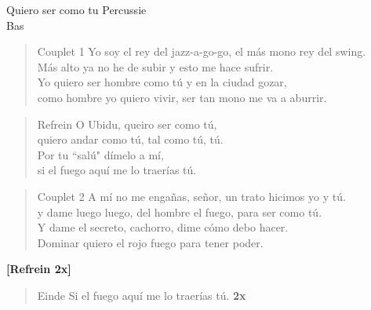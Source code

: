 \begin{song}{Quiero ser como tu}
Percussie\\
Bas\\


\begin{verse}{Couplet 1}
Yo soy el rey del jazz-a-go-go, el m\'as mono rey del swing.\\
M\'as alto ya no he de subir y esto me hace sufrir.\\
Yo quiero ser hombre como t\'u y en la ciudad gozar,\\
como hombre yo quiero vivir, ser tan mono me va a aburrir. \hspace{3em} \hspace{1em}
\end{verse}

\begin{verse}{Refrein}
O Ubidu, queiro ser como t\'u,\\
quiero andar como t\'u, tal como t\'u, t\'u.\\
Por tu ``sal\'u" d\'imelo a m\'i,\\
si el fuego aqu\'i me lo traer\'ias t\'u.\\
\end{verse}

\begin{verse}{Couplet 2}
A m\'i no me enga\~nas, se\~nor, un trato hicimos yo y t\'u.\\
y dame luego luego, del hombre el fuego, para ser como t\'u.\\
Y dame el secreto, cachorro, dime c\'omo debo hacer.\\
Dominar quiero el rojo fuego para tener poder. \hspace{3em} \hspace{1em}
\end{verse}

\textbf{[Refrein 2x]}\\


\begin{verse}{Einde}
Si el fuego aqu\'i me lo traer\'ias t\'u. \textbf{2x}
\end{verse}
\end{song}

